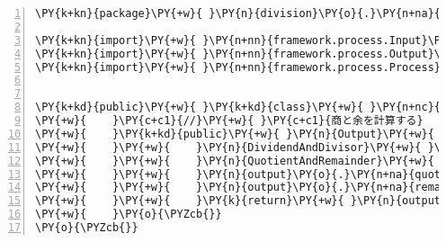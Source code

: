 \begin{Verbatim}[commandchars=\\\{\},numbers=left,firstnumber=1,stepnumber=1,frame=single,fontsize=\small]
\PY{k+kn}{package}\PY{+w}{ }\PY{n}{division}\PY{o}{.}\PY{n+na}{process}\PY{o}{;}

\PY{k+kn}{import}\PY{+w}{ }\PY{n+nn}{framework.process.Input}\PY{o}{;}
\PY{k+kn}{import}\PY{+w}{ }\PY{n+nn}{framework.process.Output}\PY{o}{;}
\PY{k+kn}{import}\PY{+w}{ }\PY{n+nn}{framework.process.Process}\PY{o}{;}


\PY{k+kd}{public}\PY{+w}{ }\PY{k+kd}{class}\PY{+w}{ }\PY{n+nc}{DivisionProcess}\PY{+w}{ }\PY{k+kd}{implements}\PY{+w}{ }\PY{n}{Process}\PY{+w}{ }\PY{o}{\PYZob{}}
\PY{+w}{    }\PY{c+c1}{//}\PY{+w}{ }\PY{c+c1}{商と余を計算する}
\PY{+w}{    }\PY{k+kd}{public}\PY{+w}{ }\PY{n}{Output}\PY{+w}{ }\PY{n+nf}{process}\PY{o}{(}\PY{n}{Input}\PY{+w}{ }\PY{n}{input}\PY{o}{)}\PY{+w}{ }\PY{o}{\PYZob{}}
\PY{+w}{    }\PY{+w}{    }\PY{n}{DividendAndDivisor}\PY{+w}{ }\PY{n}{dad}\PY{+w}{ }\PY{o}{=}\PY{+w}{ }\PY{o}{(}\PY{n}{DividendAndDivisor}\PY{o}{)}\PY{+w}{ }\PY{n}{input}\PY{o}{;}
\PY{+w}{    }\PY{+w}{    }\PY{n}{QuotientAndRemainder}\PY{+w}{ }\PY{n}{output}\PY{+w}{ }\PY{o}{=}\PY{+w}{ }\PY{k}{new}\PY{+w}{ }\PY{n}{QuotientAndRemainder}\PY{o}{(}\PY{o}{)}\PY{o}{;}
\PY{+w}{    }\PY{+w}{    }\PY{n}{output}\PY{o}{.}\PY{n+na}{quotient}\PY{+w}{ }\PY{o}{=}\PY{+w}{ }\PY{n}{dad}\PY{o}{.}\PY{n+na}{dividend}\PY{+w}{ }\PY{o}{/}\PY{+w}{ }\PY{n}{dad}\PY{o}{.}\PY{n+na}{divisor}\PY{o}{;}
\PY{+w}{    }\PY{+w}{    }\PY{n}{output}\PY{o}{.}\PY{n+na}{remainder}\PY{+w}{ }\PY{o}{=}\PY{+w}{ }\PY{n}{dad}\PY{o}{.}\PY{n+na}{dividend}\PY{+w}{ }\PY{o}{\PYZpc{}}\PY{+w}{ }\PY{n}{dad}\PY{o}{.}\PY{n+na}{divisor}\PY{o}{;}
\PY{+w}{    }\PY{+w}{    }\PY{k}{return}\PY{+w}{ }\PY{n}{output}\PY{o}{;}
\PY{+w}{    }\PY{o}{\PYZcb{}}
\PY{o}{\PYZcb{}}
\end{Verbatim}
